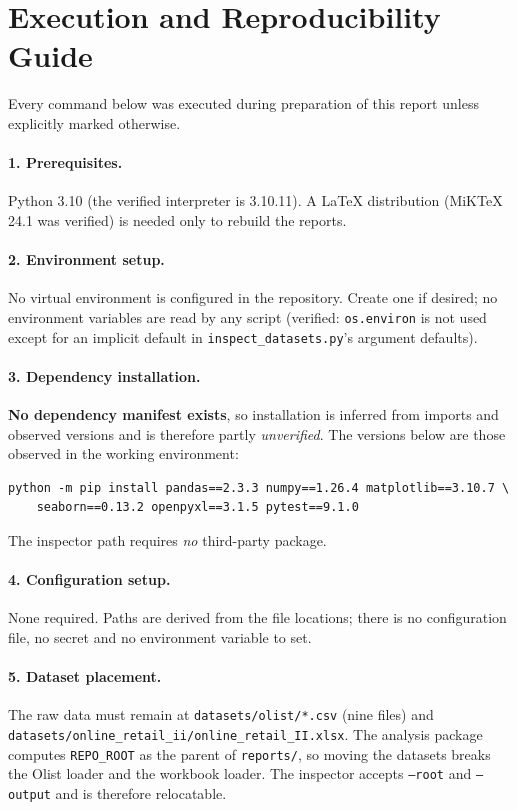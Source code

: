 \documentclass[11pt,a4paper]{article}
\newcommand{\code}[1]{\texttt{#1}}
\begin{document}
\section{Execution and Reproducibility Guide}
\label{sec:exec}
Every command below was executed during preparation of this report unless explicitly marked otherwise.

\paragraph{1. Prerequisites.} Python 3.10 (the verified interpreter is 3.10.11). A \LaTeX{} distribution (MiKTeX 24.1 was verified) is needed only to rebuild the reports.

\paragraph{2. Environment setup.} No virtual environment is configured in the repository. Create one if desired; no environment variables are read by any script (verified: \code{os.environ} is not used except for an implicit default in \code{inspect\_datasets.py}'s argument defaults).

\paragraph{3. Dependency installation.} \textbf{No dependency manifest exists}, so installation is inferred from imports and observed versions and is therefore partly \emph{unverified}. The versions below are those observed in the working environment:
\begin{verbatim}
python -m pip install pandas==2.3.3 numpy==1.26.4 matplotlib==3.10.7 \
    seaborn==0.13.2 openpyxl==3.1.5 pytest==9.1.0
\end{verbatim}
The inspector path requires \emph{no} third-party package.

\paragraph{4. Configuration setup.} None required. Paths are derived from the file locations; there is no configuration file, no secret and no environment variable to set.

\paragraph{5. Dataset placement.} The raw data must remain at \code{datasets/olist/*.csv} (nine files) and \code{datasets/online\_retail\_ii/online\_retail\_II.xlsx}. The analysis package computes \code{REPO\_ROOT} as the parent of \code{reports/}, so moving the datasets breaks the Olist loader and the workbook loader. The inspector accepts \code{--root} and \code{--output} and is therefore relocatable.
\end{document}
